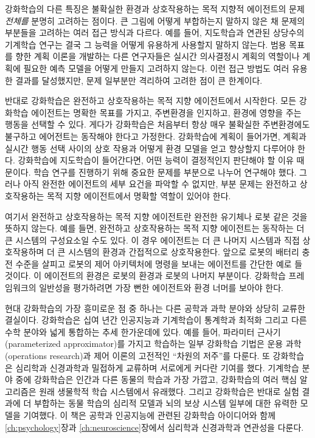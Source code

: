 강화학습의 다른 특징은 불확실한 환경과 상호작용하는 목적 지향적 에이전트의 문제
\emph{전체를} 분명히 고려하는 점이다. 큰 그림에 어떻게 부합하는지 말하지 않은 채
문제의 부분들을 고려하는 여러 접근 방식과 다르다. 예를 들어, 지도학습과 연관된
상당수의 기계학습 연구는 결국 그 능력을 어떻게 유용하게 사용할지 말하지 않는다.
범용 목표를 향한 계획 이론을 개발하는 다른 연구자들은 실시간 의사결정시 계획의
역할이나 계획에 필요한 예측 모델을 어떻게 만들지 고려하지 않는다. 이런 접근
방법도 여러 유용한 결과를 달성했지만, 문제 일부분만 격리하여 고려한 점이 큰
한계이다.

반대로 강화학습은 완전하고 상호작용하는 목적 지향 에이전트에서 시작한다. 모든
강화학습 에이전트는 명확한 목표를 가지고, 주변환경을 인지하고, 환경에 영향을
주는 행동을 선택할 수 있다. 게다가 강화학습은 처음부터 항상 매우 불확실한
주변환경에도 불구하고 에어전트는 동작해야 한다고 가정한다. 강화학습에 계획이
들어가면, 계획과 실시간 행동 선택 사이의 상호 작용과 어떻게 환경 모델을 얻고
향상할지 다루어야 한다. 강화학습에 지도학습이 들어간다면, 어떤 능력이 결정적인지
판단해야 할 이유 때문이다. 학습 연구를 진행하기 위해 중요한 문제를 부분으로
나누어 연구해야 했다. 그러나 아직 완전한 에이전트의 세부 요건을 파악할 수
없지만, 부분 문제는 완전하고 상호작용하는 목적 지향 에이전트에서 명확할 역할이
있어야 한다.

여기서 완전하고 상호작용하는 목적 지향 에이전트란 완전한 유기체나 로봇 같은 것을
뜻하지 않는다. 예를 들면, 완전하고 상호작용하는 목적 지향 에이전트는 동작하는 더
큰 시스템의 구성요소일 수도 있다. 이 경우 에이전트는 더 큰 나머지 시스템과 직접
상호작용하며 더 큰 시스템의 환경과 간접적으로 상호작용한다. 앞으로 로봇의 배터리
충전 수준을 살피고 로봇의 제어 아키텍처에 명령을 보내는 에이전트를 간단한 예로
들 것이다. 이 에이전트의 환경은 로봇의 환경과 로봇의 나머지 부분이다. 강화학습
프레임워크의 일반성을 평가하려면 가장 뻔한 에이전트와 환경 너머를 보아야 한다.


현대 강화학습의 가장 흥미로운 점 중 하나는 다른 공학과 과학 분야와 상당히 교류한
결실이다. 강화학습은 십여 년간 인공지능과 기계학습이 통계학과 최적화 그리고 다른
수학 분야와 넓게 통합하는 추세 한가운데에 있다. 예를 들어, 파라미터
근사기(parameterized approximator)를 가지고 학습하는 일부 강화학습 기법은 운용
과학(operations research)과 제어 이론의 고전적인 ``차원의 저주''를 다룬다. 또
강화학습은 심리학과 신경과학과 밀접하게 교류하며 서로에게 커다란 기여를 했다.
기계학습 분야 중에 강화학습은 인간과 다른 동물의 학습과 가장 가깝고, 강화학습의
여러 핵심 알고리즘은 원래 생물학적 학습 시스템에서 유래했다. 그리고 강화학습은
반대로 실험 결과에 더 부합하는 동물 학습의 심리적 모델과 뇌의 보상 시스템 일부에
대한 유력한 모델을 기여했다. 이 책은 공학과 인공지능에 관련된 강화학습
아이디어와 함께 \ref{ch:psychology}장과 \ref{ch:neuroscience}장에서 심리학과
신경과학과 연관성을 다룬다.

